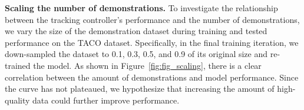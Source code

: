 \vspace{-5pt}
\noindent\textbf{Scaling the number of demonstrations.} 
To investigate the relationship between the tracking controller's performance and the number of demonstrations, we vary the size of the demonstration dataset during training and tested performance on the TACO dataset. Specifically, in the final training iteration, we down-sampled the dataset to 0.1, 0.3, 0.5, and 0.9 of its original size and re-trained the model. As shown in Figure~\ref{fig:fig_scaling}, there is a clear correlation between the amount of demonstrations and model performance. Since the curve has not plateaued, we hypothesize that increasing the amount of high-quality data could further improve performance.
 



\vspace{-10pt}

